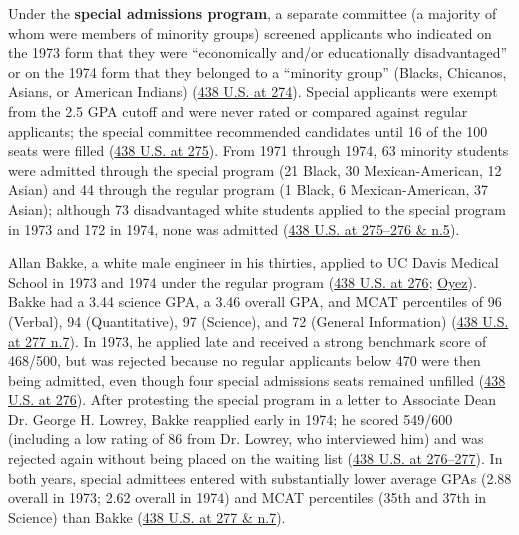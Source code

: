 \documentclass[12pt]{article}
\begin{document}
Under the \textbf{special admissions program}, a separate committee (a majority of whom were members of minority groups) screened applicants who indicated on the 1973 form that they were ``economically and/or educationally disadvantaged'' or on the 1974 form that they belonged to a ``minority group'' (Blacks, Chicanos, Asians, or American Indians) (\href{https://supreme.justia.com/cases/federal/us/438/265/}{438 U.S. at 274}). Special applicants were exempt from the 2.5 GPA cutoff and were never rated or compared against regular applicants; the special committee recommended candidates until 16 of the 100 seats were filled (\href{https://supreme.justia.com/cases/federal/us/438/265/}{438 U.S. at 275}). From 1971 through 1974, 63 minority students were admitted through the special program (21 Black, 30 Mexican-American, 12 Asian) and 44 through the regular program (1 Black, 6 Mexican-American, 37 Asian); although 73 disadvantaged white students applied to the special program in 1973 and 172 in 1974, none was admitted (\href{https://supreme.justia.com/cases/federal/us/438/265/}{438 U.S. at 275--276 \& n.5}).

Allan Bakke, a white male engineer in his thirties, applied to UC Davis Medical School in 1973 and 1974 under the regular program (\href{https://supreme.justia.com/cases/federal/us/438/265/}{438 U.S. at 276}; \href{https://www.oyez.org/cases/1979/76-811}{Oyez}). Bakke had a 3.44 science GPA, a 3.46 overall GPA, and MCAT percentiles of 96 (Verbal), 94 (Quantitative), 97 (Science), and 72 (General Information) (\href{https://supreme.justia.com/cases/federal/us/438/265/}{438 U.S. at 277 n.7}). In 1973, he applied late and received a strong benchmark score of 468/500, but was rejected because no regular applicants below 470 were then being admitted, even though four special admissions seats remained unfilled (\href{https://supreme.justia.com/cases/federal/us/438/265/}{438 U.S. at 276}). After protesting the special program in a letter to Associate Dean Dr. George H. Lowrey, Bakke reapplied early in 1974; he scored 549/600 (including a low rating of 86 from Dr. Lowrey, who interviewed him) and was rejected again without being placed on the waiting list (\href{https://supreme.justia.com/cases/federal/us/438/265/}{438 U.S. at 276--277}). In both years, special admittees entered with substantially lower average GPAs (2.88 overall in 1973; 2.62 overall in 1974) and MCAT percentiles (35th and 37th in Science) than Bakke (\href{https://supreme.justia.com/cases/federal/us/438/265/}{438 U.S. at 277 \& n.7}).
\end{document}
